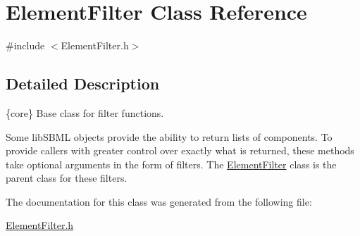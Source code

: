 \hypertarget{class_element_filter}{}\section{Element\+Filter Class Reference}
\label{class_element_filter}


{\ttfamily \#include $<$Element\+Filter.\+h$>$}



\subsection{Detailed Description}
\{core\} Base class for filter functions.



Some lib\+S\+B\+ML objects provide the ability to return lists of components. To provide callers with greater control over exactly what is returned, these methods take optional arguments in the form of filters. The \hyperlink{class_element_filter}{Element\+Filter} class is the parent class for these filters. 

The documentation for this class was generated from the following file\+:\begin{DoxyCompactItemize}
\item 
\hyperlink{_element_filter_8h}{Element\+Filter.\+h}\end{DoxyCompactItemize}
